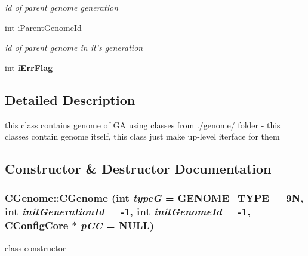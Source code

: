 \begin{DoxyCompactItemize}
\begin{DoxyCompactList}\small\item\em id of parent genome generation \item\end{DoxyCompactList}\item 
\hypertarget{classCGenome_a724262d508e6d5426fe62d1df6945d68}{
int \hyperlink{classCGenome_a724262d508e6d5426fe62d1df6945d68}{iParentGenomeId}}
\label{classCGenome_a724262d508e6d5426fe62d1df6945d68}

\begin{DoxyCompactList}\small\item\em id of parent genome in it's generation \item\end{DoxyCompactList}\item 
\hypertarget{classCGenome_a5420e4d9d8f04f42a93f6b4b8e2883b4}{
int {\bfseries iErrFlag}}
\label{classCGenome_a5420e4d9d8f04f42a93f6b4b8e2883b4}

\end{DoxyCompactItemize}


\subsection{Detailed Description}
this class contains genome of GA using classes from ./genome/ folder -\/ this classes contain genome itself, this class just make up-\/level iterface for them 

\subsection{Constructor \& Destructor Documentation}
\hypertarget{classCGenome_a457e2d373926103a835472d689e8e2e7}{
\subsubsection[{CGenome}]{\setlength{\rightskip}{0pt plus 5cm}CGenome::CGenome (int {\em typeG} = {\ttfamily GENOME\_\-TYPE\_\_\-9N}, \/  int {\em initGenerationId} = {\ttfamily -\/1}, \/  int {\em initGenomeId} = {\ttfamily -\/1}, \/  {\bf CConfigCore} $\ast$ {\em pCC} = {\ttfamily NULL})}}
\label{classCGenome_a457e2d373926103a835472d689e8e2e7}
class constructor


